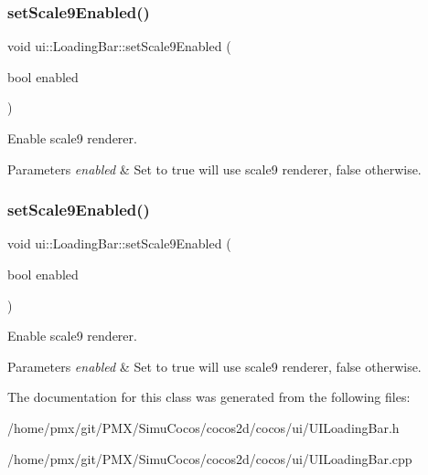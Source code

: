 \subsubsection{\texorpdfstring{set\+Scale9\+Enabled()}{setScale9Enabled()}\hspace{0.1cm}{\footnotesize\ttfamily [1/2]}}
{\footnotesize\ttfamily void ui\+::\+Loading\+Bar\+::set\+Scale9\+Enabled (\begin{DoxyParamCaption}\item[{bool}]{enabled }\end{DoxyParamCaption})}

Enable scale9 renderer.


\begin{DoxyParams}{Parameters}
{\em enabled} & Set to true will use scale9 renderer, false otherwise. \\
\hline
\end{DoxyParams}
\mbox{\label{classui_1_1LoadingBar_adbc9e1eb4d8bb1881d37506443f1ee6d}} 
\subsubsection{\texorpdfstring{set\+Scale9\+Enabled()}{setScale9Enabled()}\hspace{0.1cm}{\footnotesize\ttfamily [2/2]}}
{\footnotesize\ttfamily void ui\+::\+Loading\+Bar\+::set\+Scale9\+Enabled (\begin{DoxyParamCaption}\item[{bool}]{enabled }\end{DoxyParamCaption})}

Enable scale9 renderer.


\begin{DoxyParams}{Parameters}
{\em enabled} & Set to true will use scale9 renderer, false otherwise. \\
\hline
\end{DoxyParams}


The documentation for this class was generated from the following files\+:\begin{DoxyCompactItemize}
\item 
/home/pmx/git/\+P\+M\+X/\+Simu\+Cocos/cocos2d/cocos/ui/U\+I\+Loading\+Bar.\+h\item 
/home/pmx/git/\+P\+M\+X/\+Simu\+Cocos/cocos2d/cocos/ui/U\+I\+Loading\+Bar.\+cpp\end{DoxyCompactItemize}
